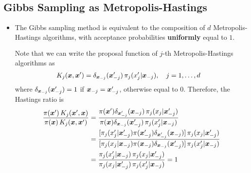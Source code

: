 \documentclass[11pt]{article}
\begin{document}
\subsection{Gibbs Sampling as Metropolis-Hastings}
\begin{itemize}
\item \begin{theorem}
The Gibbs sampling method is equivalent to the composition of $d$ Metropolis-Hastings algorithms, with acceptance probabilities \textbf{uniformly} equal to $1$.
\end{theorem}
Note that we can write the proposal function of $j$-th Metropolis-Hastings algorithms as 
\begin{align}
K_{j}(\boldsymbol{x}, \boldsymbol{x}') &= \delta_{\boldsymbol{x}_{-j}}(\boldsymbol{x}_{-j}')\, \pi_{j}(x_{j}'| \boldsymbol{x}_{-j}), \quad j=1,\ldots, d \label{eqn: gibbs_mh_proposal}
\end{align} where $\delta_{\boldsymbol{x}_{-j}}(\boldsymbol{x}_{-j}') = 1$ if $\boldsymbol{x}_{-j} = \boldsymbol{x}_{-j}'$, otherwise equal to $0$.
Therefore, the Hastings ratio is 
\begin{align*}
\frac{\pi(\boldsymbol{x}')\,K_{j}(\boldsymbol{x}', \boldsymbol{x})}{\pi(\boldsymbol{x})\,K_{j}(\boldsymbol{x}, \boldsymbol{x}')} &= \frac{\pi(\boldsymbol{x}')\delta_{\boldsymbol{x}_{-j}'}(\boldsymbol{x}_{-j})\, \pi_{j}(x_{j}| \boldsymbol{x}_{-j}')}{\pi(\boldsymbol{x})\delta_{\boldsymbol{x}_{-j}}(\boldsymbol{x}_{-j}')\, \pi_{j}(x_{j}'| \boldsymbol{x}_{-j})}
\\
&=\frac{[\pi_{j}(x_{j}'|\boldsymbol{x}_{-j}')\pi(\boldsymbol{x}_{-j}')\delta_{\boldsymbol{x}_{-j}'}(\boldsymbol{x}_{-j})]\, \pi_{j}(x_{j}| \boldsymbol{x}_{-j}')}{[\pi_{j}(x_{j}|\boldsymbol{x}_{-j})\pi(\boldsymbol{x}_{-j})\delta_{\boldsymbol{x}_{-j}}(\boldsymbol{x}_{-j}')]\, \pi_{j}(x_{j}'| \boldsymbol{x}_{-j})}\\
&=\frac{\pi_{j}(x_{j}'|\boldsymbol{x}_{-j})\, \pi_{j}(x_{j}| \boldsymbol{x}_{-j}')}{\pi_{j}(x_{j}|\boldsymbol{x}_{-j}')\, \pi_{j}(x_{j}'| \boldsymbol{x}_{-j})}= 1
\end{align*} 
\end{itemize}
\end{document}
